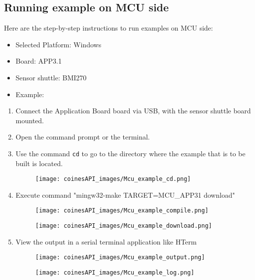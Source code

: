 \documentclass{article}
\begin{document}
\subsection{Running example on MCU side}
Here are the step-by-step instructions to run examples on MCU side:
\begin{itemize}
	\item Selected Platform: Windows
	\item Board: APP3.1
	\item Sensor shuttle: BMI270
	\item Example: 
\end{itemize}
\begin{enumerate}
	\item Connect the Application Board board via USB, with the sensor shuttle board mounted.
	\item Open the command prompt or the terminal.
	\item Use the command \texttt{cd} to go to the directory where the example that is to be built is located.
	\begin{figure}[H]
		\begin{center}
			\texttt{[image: coinesAPI\_images/Mcu\_example\_cd.png]}
		\end{center}
	\end{figure}
	\item Execute command "mingw32-make TARGET=MCU\_APP31 download"
	\begin{figure}[H]
		\begin{center}
			\texttt{[image: coinesAPI\_images/Mcu\_example\_compile.png]}
		\end{center}
	\end{figure}
	\begin{figure}[H]
		\begin{center}
			\texttt{[image: coinesAPI\_images/Mcu\_example\_download.png]}
		\end{center}
	\end{figure}
	\item View the output in a serial terminal application like HTerm
	\begin{figure}[H]
		\begin{center}
			\texttt{[image: coinesAPI\_images/Mcu\_example\_output.png]}
		\end{center}
	\end{figure}
	\begin{figure}[H]
		\begin{center}
			\texttt{[image: coinesAPI\_images/Mcu\_example\_log.png]}
		\end{center}
	\end{figure}
\end{enumerate}
\end{document}
